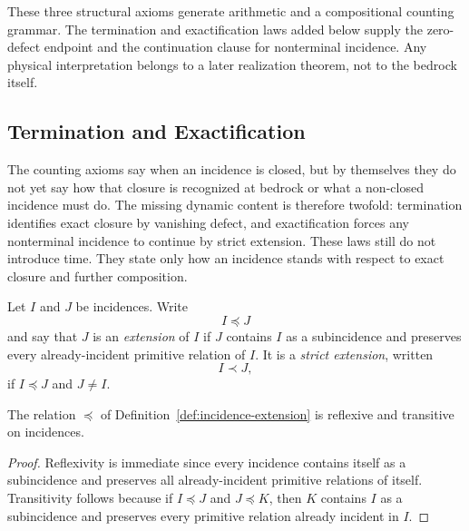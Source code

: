 These three structural axioms generate arithmetic and a compositional counting
grammar. The termination and exactification laws added below supply the
zero-defect endpoint and the continuation clause for nonterminal incidence.
Any physical interpretation belongs to a later realization theorem, not to the
bedrock itself.

\subsection{Termination and Exactification}
\label{subsec:exactification-terminal-incidence}

The counting axioms say when an incidence is closed, but by themselves they do
not yet say how that closure is recognized at bedrock or what a non-closed
incidence must do. The missing dynamic content is therefore twofold:
termination identifies exact closure by vanishing defect, and exactification
forces any nonterminal incidence to continue by strict extension. These laws
still do not introduce time. They state only how an incidence stands with
respect to exact closure and further composition.

\begin{definition}
\label{def:incidence-extension}
Let \(I\) and \(J\) be incidences. Write
\[
I \preceq J
\]
and say that \(J\) is an \emph{extension} of \(I\) if \(J\) contains \(I\) as
a subincidence and preserves every already-incident primitive relation of
\(I\). It is a \emph{strict extension}, written
\[
I \prec J,
\]
if \(I \preceq J\) and \(J\neq I\).
\end{definition}

\begin{proposition}
\label{prop:extension-is-preorder}
The relation \(\preceq\) of
Definition~\ref{def:incidence-extension} is reflexive and transitive on
incidences.
\end{proposition}

\begin{proof}
Reflexivity is immediate since every incidence contains itself as a
subincidence and preserves all already-incident primitive relations of itself.
Transitivity follows because if \(I\preceq J\) and \(J\preceq K\), then
\(K\) contains \(I\) as a subincidence and preserves every primitive relation
already incident in \(I\).
\end{proof}


